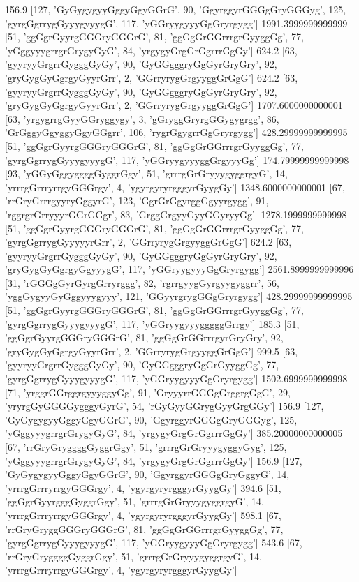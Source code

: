 156.9 [127, 'GyGygygyyGggyGgyGGrG', 90, 'GgyrggyrGGGgGryGGGyg', 125, 'gyrgGgrrygGyyygyyygG', 117, 'yGGryygyyyGgGryrgygg']
1991.3999999999999 [51, 'ggGgrGyyrgGGGryGGGrG', 81, 'ggGgGrGGrrrgrGyyggGg', 77, 'yGggyyygrrgrGrygyGyG', 84, 'yrgygyGrgGrGgrrrGgGy']
624.2 [63, 'gyyryyGrgrrGygggGyGy', 90, 'GyGGgggryGgGyrGryGry', 92, 'gryGygGyGgrgyGyyrGrr', 2, 'GGrryrygGrgyyggGrGgG']
624.2 [63, 'gyyryyGrgrrGygggGyGy', 90, 'GyGGgggryGgGyrGryGry', 92, 'gryGygGyGgrgyGyyrGrr', 2, 'GGrryrygGrgyyggGrGgG']
1707.6000000000001 [63, 'yrgygrrgGyyGGryggygy', 3, 'gGryggGryrgGGygygrgg', 86, 'GrGggyGgyggyGgyGGgrr', 106, 'rygrGgygrrGgGryrgygg']
428.29999999999995 [51, 'ggGgrGyyrgGGGryGGGrG', 81, 'ggGgGrGGrrrgrGyyggGg', 77, 'gyrgGgrrygGyyygyyygG', 117, 'yGGryygyyyggGrgyyyGg']
174.79999999999998 [93, 'yGGyGggyggggGyggrGgy', 51, 'grrrgGrGryyygyggrgyG', 14, 'yrrrgGrrryrrgyGGGrgy', 4, 'ygyrgyryrgggyrGyygGy']
1348.6000000000001 [67, 'rrGryGrrrgyyryGggyrG', 123, 'GgrGrGgyrggGgyyrgygg', 91, 'rggrgrGrryyyrGGrGGgr', 83, 'GrggGrgyyGyyGGyryyGg']
1278.1999999999998 [51, 'ggGgrGyyrgGGGryGGGrG', 81, 'ggGgGrGGrrrgrGyyggGg', 77, 'gyrgGgrrygGyyyyyrGrr', 2, 'GGrryrygGrgyyggGrGgG']
624.2 [63, 'gyyryyGrgrrGygggGyGy', 90, 'GyGGgggryGgGyrGryGry', 92, 'gryGygGyGgrgyGgyyygG', 117, 'yGGryygyyyGgGryrgygg']
2561.8999999999996 [31, 'rGGGgGyrGyrgGrryrggg', 82, 'rgrrgyygGyrgyygyggrr', 56, 'yggGygyyGyGggyyygyyy', 121, 'GGyyrgrygGGgGryrgygg']
428.29999999999995 [51, 'ggGgrGyyrgGGGryGGGrG', 81, 'ggGgGrGGrrrgrGyyggGg', 77, 'gyrgGgrrygGyyygyyygG', 117, 'yGGryygyyygggggGrrgy']
185.3 [51, 'ggGgrGyyrgGGGryGGGrG', 81, 'ggGgGrGGrrrgyrGryGry', 92, 'gryGygGyGgrgyGyyrGrr', 2, 'GGrryrygGrgyyggGrGgG']
999.5 [63, 'gyyryyGrgrrGygggGyGy', 90, 'GyGGgggryGgGrGyyggGg', 77, 'gyrgGgrrygGyyygyyygG', 117, 'yGGryygyyyGgGryrgygg']
1502.6999999999998 [71, 'yrggrGGrggrgyyyggyGg', 91, 'GryyyrrGGGgGrggrgGgG', 29, 'yryrgGyGGGGygggyGyrG', 54, 'rGyGyyGGrygGyyGrgGGy']
156.9 [127, 'GyGygygyyGggyGgyGGrG', 90, 'GgyrggyrGGGgGryGGGyg', 125, 'yGggyyygrrgrGrygyGyG', 84, 'yrgygyGrgGrGgrrrGgGy']
385.20000000000005 [67, 'rrGryGryggggGyggrGgy', 51, 'grrrgGrGryyygyggyGyg', 125, 'yGggyyygrrgrGrygyGyG', 84, 'yrgygyGrgGrGgrrrGgGy']
156.9 [127, 'GyGygygyyGggyGgyGGrG', 90, 'GgyrggyrGGGgGryGggyG', 14, 'yrrrgGrrryrrgyGGGrgy', 4, 'ygyrgyryrgggyrGyygGy']
394.6 [51, 'ggGgrGyyrgggGyggrGgy', 51, 'grrrgGrGryyygyggrgyG', 14, 'yrrrgGrrryrrgyGGGrgy', 4, 'ygyrgyryrgggyrGyygGy']
598.1 [67, 'rrGryGryggGGGryGGGrG', 81, 'ggGgGrGGrrrgrGyyggGg', 77, 'gyrgGgrrygGyyygyyygG', 117, 'yGGryygyyyGgGryrgygg']
543.6 [67, 'rrGryGryggggGyggrGgy', 51, 'grrrgGrGryyygyggrgyG', 14, 'yrrrgGrrryrrgyGGGrgy', 4, 'ygyrgyryrgggyrGyygGy']
